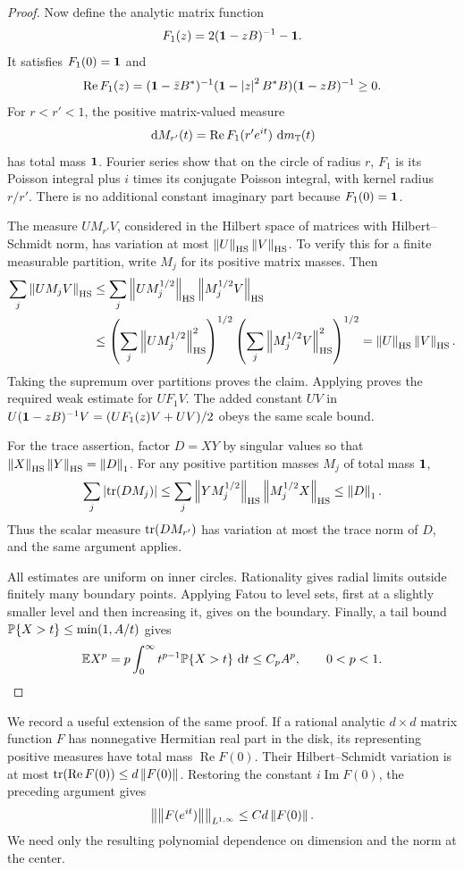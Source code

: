 \begin{proof}
Now define the analytic matrix function
\[
 F_1(z)=2(\mathbf 1-zB)^{-1}-\mathbf 1.
\]
It satisfies $F_1(0)=\mathbf 1$ and
\[
 \operatorname{Re}F_1(z)
 = (\mathbf 1-\bar zB^*)^{-1}
       (\mathbf 1-\left\lvert z\right\rvert^2B^*B)(\mathbf 1-zB)^{-1}\ge0.
\]
For $r<r'<1$, the positive matrix-valued measure
\[
 \,\mathrm d M_{r'}(t)=\operatorname{Re}F_1(r'e^{it})\,\,\mathrm d m_\mathbb T(t)
\]
has total mass $\mathbf 1$. Fourier series show that on the circle of radius
$r$, $F_1$ is its Poisson integral plus $i$ times its conjugate Poisson
integral, with kernel radius $r/r'$. There is no additional constant
imaginary part because $F_1(0)=\mathbf 1$.

The measure $U M_{r'} V$, considered in the Hilbert space of matrices
with Hilbert--Schmidt norm, has variation at most
$\left\lVert U\right\rVert_{\mathrm{HS}}\left\lVert V\right\rVert_{\mathrm{HS}}$. To verify this for a
finite measurable partition, write $M_j$ for its positive matrix
masses. Then
\begin{align*}
 \sum_j\left\lVert UM_jV\right\rVert_{\mathrm{HS}}
 &\le\sum_j\left\lVert UM_j^{1/2}\right\rVert_{\mathrm{HS}}
                \left\lVert M_j^{1/2}V\right\rVert_{\mathrm{HS}}\\
 &\le\left(\sum_j\left\lVert UM_j^{1/2}\right\rVert_{\mathrm{HS}}^2\right)^{1/2}
       \left(\sum_j\left\lVert M_j^{1/2}V\right\rVert_{\mathrm{HS}}^2\right)^{1/2}
  =\left\lVert U\right\rVert_{\mathrm{HS}}\left\lVert V\right\rVert_{\mathrm{HS}}.
\end{align*}
Taking the supremum over partitions proves the claim. Applying
 proves the required weak estimate for $UF_1V$.
The added constant $UV$ in
$U(\mathbf 1-zB)^{-1}V=(UF_1(z)V+UV)/2$ obeys the same scale bound.

For the trace assertion, factor $D=XY$ by singular values so that
$\left\lVert X\right\rVert_{\mathrm{HS}}\left\lVert Y\right\rVert_{\mathrm{HS}}=\left\lVert D\right\rVert_1$. For any
positive partition masses $M_j$ of total mass $\mathbf 1$,
\[
 \sum_j\left\lvert\operatorname{tr}(DM_j)\right\rvert
 \le\sum_j\left\lVert YM_j^{1/2}\right\rVert_{\mathrm{HS}}
              \left\lVert M_j^{1/2}X\right\rVert_{\mathrm{HS}}
 \le\left\lVert D\right\rVert_1.
\]
Thus the scalar measure $\operatorname{tr}(DM_{r'})$ has variation at most the trace
norm of $D$, and the same argument applies.

All estimates are uniform on inner circles. Rationality gives radial
limits outside finitely many boundary points. Applying Fatou to level
sets, first at a slightly smaller level and then increasing it, gives
 on the boundary. Finally, a tail
bound $\mathbb P\{X>t\}\le\min(1,A/t)$ gives
\[
 \mathbb E X^p=p\int_0^\infty t^{p-1}\mathbb P\{X>t\}\,\,\mathrm d t
          \le C_p A^p,
 \qquad 0<p<1.
\]
\end{proof}

We record a useful extension of the same proof. If a rational analytic
$d\times d$ matrix function $F$ has nonnegative Hermitian real part in
the disk, its representing positive measures have total mass
$\operatorname{Re}F(0)$. Their Hilbert--Schmidt variation is at most
$\operatorname{tr}(\operatorname{Re}F(0))\le d\left\lVert F(0)\right\rVert$. Restoring the constant
$i\operatorname{Im}F(0)$, the preceding argument gives
\begin{equation}
 \left\|\left\lVert F(e^{it})\right\rVert\right\|_{L^{1,\infty}}
       \le C d\left\lVert F(0)\right\rVert.
 \label{mat:positive-real-extension}
\end{equation}
We need only the resulting polynomial dependence on dimension and the
norm at the center.

